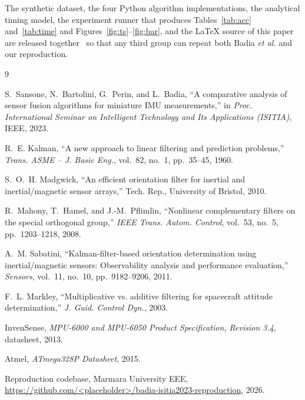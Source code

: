 \documentclass[conference]{IEEEtran}
\begin{document}
The synthetic dataset, the four Python algorithm implementations,
the analytical timing model, the experiment runner that produces
Tables~\ref{tab:acc} and~\ref{tab:time} and
Figures~\ref{fig:ts}--\ref{fig:bar}, and the LaTeX source of this
paper are released together~\cite{ourcode} so that any third
group can repeat both Badia \textit{et al.} and our reproduction.

\begin{thebibliography}{9}

S.~Sansone, N.~Bartolini, G.~Perin, and L.~Badia,
``A comparative analysis of sensor fusion algorithms for miniature
IMU measurements,'' in \emph{Proc. International Seminar on
Intelligent Technology and Its Applications (ISITIA)}, IEEE, 2023.

R.~E. Kalman,
``A new approach to linear filtering and prediction problems,''
\emph{Trans. ASME -- J. Basic Eng.}, vol.~82, no.~1, pp.~35--45, 1960.

S.~O.~H. Madgwick,
``An efficient orientation filter for inertial and
inertial/magnetic sensor arrays,'' Tech. Rep., University of
Bristol, 2010.

R.~Mahony, T.~Hamel, and J.-M.~Pflimlin,
``Nonlinear complementary filters on the special orthogonal
group,'' \emph{IEEE Trans. Autom. Control}, vol.~53, no.~5,
pp.~1203--1218, 2008.

A.~M. Sabatini,
``Kalman-filter-based orientation determination using
inertial/magnetic sensors: Observability analysis and performance
evaluation,'' \emph{Sensors}, vol.~11, no.~10, pp.~9182--9206, 2011.

F.~L. Markley,
``Multiplicative vs. additive filtering for spacecraft attitude
determination,'' \emph{J. Guid. Control Dyn.}, 2003.

InvenSense, \emph{MPU-6000 and MPU-6050 Product Specification,
Revision 3.4}, datasheet, 2013.

Atmel, \emph{ATmega328P Datasheet}, 2015.

Reproduction codebase, Marmara University EEE,
\url{https://github.com/<placeholder>/badia-isitia2023-reproduction},
2026.

\end{thebibliography}
\end{document}
